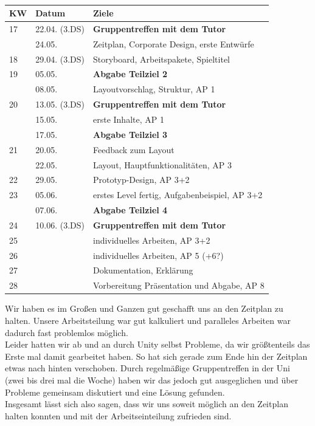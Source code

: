 \documentclass[10pt,a4paper,notitlepage]{report}
\begin{document}
	\clearpage
	\marginpar{\vspace{3.0mm} \color{orange}\rule{0.8mm}{53.3mm} \\[3mm] \color{hellorange}\rule{0.8mm}{170mm}}
	\par\bigskip

	\\\par\medskip\Text
\begin{center}
		\begin{tabular}{l|l|l}\hline
 	 KW & Datum & Ziele\\\hline
	17 & 22.04. (3.DS) & \textbf{Gruppentreffen mit dem Tutor}\\
	& 24.05. & Zeitplan, Corporate Design, erste Entwürfe\\\hline
	18 & 29.04. (3.DS) &  Storyboard, Arbeitspakete, Spieltitel\\\hline
	19 & 05.05. & \textbf{Abgabe Teilziel 2}\\
	& 08.05.& Layoutvorschlag, Struktur, AP 1\\\hline
	20 & 13.05. (3.DS) & \textbf{Gruppentreffen mit dem Tutor}\\
	& 15.05. & erste Inhalte, AP 1\\
	& 17.05. & \textbf{Abgabe Teilziel 3}\\\hline
	21 & 20.05. & Feedback zum Layout\\
	& 22.05. & Layout, Hauptfunktionalitäten, AP 3\\\hline
	22 & 29.05. & Prototyp-Design, AP 3+2 \\\hline
	23 & 05.06. & erstes Level fertig, Aufgabenbeispiel, AP 3+2\\
	& 07.06. & \textbf{Abgabe Teilziel 4}\\\hline
	24 & 10.06. (3.DS) & \textbf{Gruppentreffen mit dem Tutor}\\\hline
	25 & & individuelles Arbeiten, AP 3+2\\\hline
	26 & & individuelles Arbeiten, AP 5 (+6?)\\\hline
	27 & & Dokumentation, Erklärung\\\hline
	28 & & Vorbereitung Präsentation und Abgabe, AP 8\\\hline
	\end{tabular}
	\end{center}
	\par\bigskip
	Wir haben es im Großen und Ganzen gut geschafft uns an den Zeitplan zu halten. Unsere Arbeitsteilung war gut kalkuliert und paralleles Arbeiten war dadurch fast problemlos möglich.\\
	Leider hatten wir ab und an durch Unity selbst Probleme, da wir größtenteils das Erste mal damit gearbeitet haben. So hat sich gerade zum Ende hin der Zeitplan etwas nach hinten verschoben. Durch regelmäßige Gruppentreffen in der Uni (zwei bis drei mal die Woche) haben wir das jedoch gut ausgeglichen und über Probleme gemeinsam diskutiert und eine Lösung gefunden.\\
	Insgesamt lässt sich also sagen, dass wir uns soweit möglich an den Zeitplan halten konnten und mit der Arbeitseinteilung zufrieden sind.\\\par\smallskip
	
\end{document}
